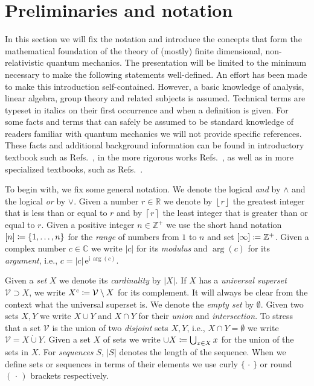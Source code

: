 \documentclass[a4paper,12pt,listof=totoc,index=totoc,bibliography=totoc,headsepline=false,headings=normal,BCOR16.153846mm,DIV12,headinclude,twoside,cleardoublepage=empty,numbers=noenddot,final]{scrreprt}
\theoremstyle{mystyle}
\numberwithin{equation}{section}
\numberwithin{figure}{section}
\numberwithin{lemma}{section}
\numberwithin{theorem}{section}
\numberwithin{corollary}{section}
\numberwithin{definition}{section}
\numberwithin{conjecture}{section}
\numberwithin{observation}{section}
\newcommand{\+}{\mkern2mu}
\newcommand{\coloneqq}{\mathrel{\vcentcolon\mkern-1.2mu=}} %
\newcommand{\union}{\cup}
\newcommand{\intersection}{\cap}
\newcommand{\dunion}{\mathbin{\dot{\cup}}}
\newcommand{\floor}[1]{\left\lfloor #1 \right\rfloor}
\newcommand{\ceiling}[1]{\left\lceil #1 \right\rceil}
\newcommand{\argdot}{{\,\cdot\,}}
\newcommand{\Vset}{\mathcal{V}}
\newcommand{\compl}[1]{{{#1}^c}}
\newcommand{\e}{\mathrm{e}}
\renewcommand{\i}{\mathrm{i}}
\DeclareMathOperator{\1}{\mathds{1}}
\newcommand{\mb}[1]{\mathbb{#1}}
\newcommand{\Z}{\mb{Z}}
\newcommand{\R}{\mb{R}}
\renewcommand{\C}{\mb{C}} %
\begin{document}
\section{Preliminaries and notation}
\label{sec:prelimiaries}
%
In this section we will fix the notation and introduce the concepts that form the mathematical foundation of the theory of (mostly) finite dimensional, non-relativistic quantum mechanics.
The presentation will be limited to the minimum necessary to make the following statements well-defined.
An effort has been made to make this introduction self-contained.
However, a basic knowledge of analysis, linear algebra, group theory and related subjects is assumed.
Technical terms are typeset in italics on their first occurrence and when a definition is given.
For some facts and terms that can safely be assumed to be standard knowledge of readers familiar with quantum mechanics we will not provide specific references.
These facts and additional background information can be found in introductory textbook such as Refs.~\cite{FeynmanV03,Sakurai1995,nielsenchuang}, in the more rigorous works Refs.~\cite{Teschl,thirringquantu,Galindo1990,Galindo1991}, as well as in more specialized textbooks, such as Refs.~\cite{Reed1980,Reed1975,bhatia2,bhatia}.

To begin with, we fix some general notation.
We denote the logical \emph{and} by $\land$ and the logical \emph{or} by $\lor$.
Given a number $r \in \R$ we denote by $\floor r$ the greatest integer that is less than or equal to $r$ and by $\ceiling r$ the least integer that is greater than or equal to $r$.
Given a positive integer $n \in \Z^+$ we use the short hand notation $[n] \coloneqq \{1,\dots,n\}$ for the \emph{range} of numbers from $1$ to $n$ and set $[\infty] \coloneqq \Z^+$.
Given a complex number $c \in \C$ we write $|c|$ for its \emph{modulus} and $\arg(c)$ for its \emph{argument}, i.e., $c = |c|\,\e^{\i\,\arg(c)}$.

Given a \emph{set} $X$ we denote its \emph{cardinality} by $|X|$.
If $X$ has a \emph{universal superset} $\Vset \supset X$, we write $\compl X \coloneqq \Vset \setminus X$ for its complement.
It will always be clear from the context what the universal superset is.
We denote the \emph{empty set} by $\emptyset$.
Given two sets $X,Y$ we write $X \union Y$ and $X \intersection Y$ for their \emph{union} and \emph{intersection}.
To stress that a set $\Vset$ is the union of two \emph{disjoint} sets $X,Y$, i.e., $X \cap Y = \emptyset$ we write
$\Vset = X \dunion Y$.
Given a set $X$ of sets we write $\union X \coloneqq \bigcup_{x \in X} x$ for the union of the sets in $X$.
For \emph{sequences} $S$, $|S|$ denotes the length of the sequence.
When we define sets or sequences in terms of their elements we use curly $\{\argdot\}$ or round $(\argdot)$ brackets respectively.
\end{document}
